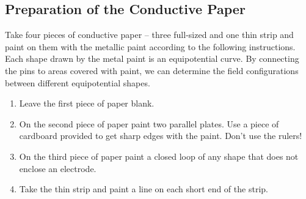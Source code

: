 \subsection{Preparation of the Conductive Paper}

Take four pieces of conductive paper -- three full-sized and one thin strip and paint on them with the metallic paint according to the following instructions. Each shape drawn by the metal paint is an equipotential curve. By connecting the pins to areas covered with paint, we can determine the field configurations between different equipotential shapes.\myskip

\begin{minipage}[h]{0.55\textwidth}
    \begin{enumerate}
        \item Leave the first piece of paper blank.
        \item On the second piece of paper paint two parallel plates. Use a piece of cardboard provided to get sharp edges with the paint. Don't use the rulers!
        \item On the third piece of paper paint a closed loop of any shape that does not enclose an electrode.
        \item Take the thin strip and paint a line on each short end of the strip.
    \end{enumerate}
\end{minipage}
\begin{minipage}[h]{0.45\textwidth}
    \begin{flushright}
        \vspace{0.5cm}
        \vspace{0.3cm}

        \vspace{0.3cm}

    \end{flushright}
\end{minipage}

